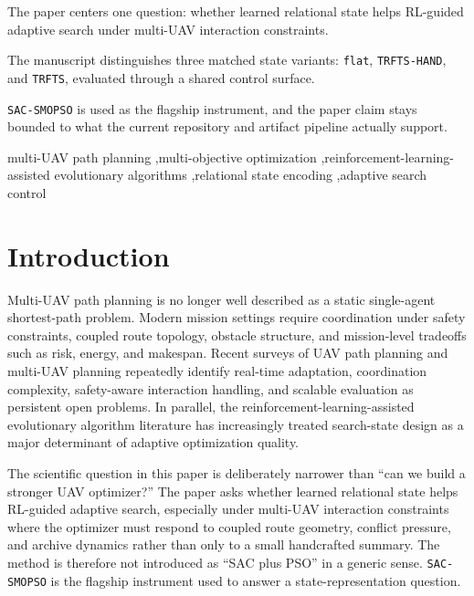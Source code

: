 \documentclass[a4paper,fleqn]{cas-sc}
\begin{document}
\begin{highlights}
\item The paper centers one question: whether learned relational state helps RL-guided adaptive search under multi-UAV interaction constraints.
\item The manuscript distinguishes three matched state variants: \texttt{flat}, \texttt{TRFTS-HAND}, and \texttt{TRFTS}, evaluated through a shared control surface.
\item \texttt{SAC-SMOPSO} is used as the flagship instrument, and the paper claim stays bounded to what the current repository and artifact pipeline actually support.
\end{highlights}

\begin{keywords}
multi-UAV path planning \sep multi-objective optimization \sep reinforcement-learning-assisted evolutionary algorithms \sep relational state encoding \sep adaptive search control
\end{keywords}

\maketitle

\section{Introduction}

Multi-UAV path planning is no longer well described as a static single-agent shortest-path problem. Modern mission settings require coordination under safety constraints, coupled route topology, obstacle structure, and mission-level tradeoffs such as risk, energy, and makespan. Recent surveys of UAV path planning and multi-UAV planning repeatedly identify real-time adaptation, coordination complexity, safety-aware interaction handling, and scalable evaluation as persistent open problems. In parallel, the reinforcement-learning-assisted evolutionary algorithm literature has increasingly treated search-state design as a major determinant of adaptive optimization quality.

The scientific question in this paper is deliberately narrower than ``can we build a stronger UAV optimizer?'' The paper asks whether learned relational state helps RL-guided adaptive search, especially under multi-UAV interaction constraints where the optimizer must respond to coupled route geometry, conflict pressure, and archive dynamics rather than only to a small handcrafted summary. The method is therefore not introduced as ``SAC plus PSO'' in a generic sense. \texttt{SAC-SMOPSO} is the flagship instrument used to answer a state-representation question.
\end{document}

